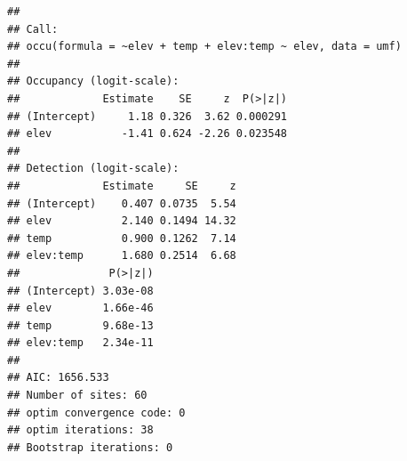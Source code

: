 \documentclass[
]{book}
\newenvironment{Shaded}{\begin{snugshade}}{\end{snugshade}}
\newcommand{\AttributeTok}[1]{\textcolor[rgb]{0.77,0.63,0.00}{#1}}
\newcommand{\CommentTok}[1]{\textcolor[rgb]{0.56,0.35,0.01}{\textit{#1}}}
\newcommand{\DecValTok}[1]{\textcolor[rgb]{0.00,0.00,0.81}{#1}}
\newcommand{\FunctionTok}[1]{\textcolor[rgb]{0.00,0.00,0.00}{#1}}
\newcommand{\NormalTok}[1]{#1}
\newcommand{\OtherTok}[1]{\textcolor[rgb]{0.56,0.35,0.01}{#1}}
\newcommand{\SpecialCharTok}[1]{\textcolor[rgb]{0.00,0.00,0.00}{#1}}
\begin{document}
\begin{verbatim}
## 
## Call:
## occu(formula = ~elev + temp + elev:temp ~ elev, data = umf)
## 
## Occupancy (logit-scale):
##             Estimate    SE     z  P(>|z|)
## (Intercept)     1.18 0.326  3.62 0.000291
## elev           -1.41 0.624 -2.26 0.023548
## 
## Detection (logit-scale):
##             Estimate     SE     z
## (Intercept)    0.407 0.0735  5.54
## elev           2.140 0.1494 14.32
## temp           0.900 0.1262  7.14
## elev:temp      1.680 0.2514  6.68
##              P(>|z|)
## (Intercept) 3.03e-08
## elev        1.66e-46
## temp        9.68e-13
## elev:temp   2.34e-11
## 
## AIC: 1656.533 
## Number of sites: 60
## optim convergence code: 0
## optim iterations: 38 
## Bootstrap iterations: 0
\end{verbatim}

\begin{Shaded}
\end{Shaded}
\end{document}
